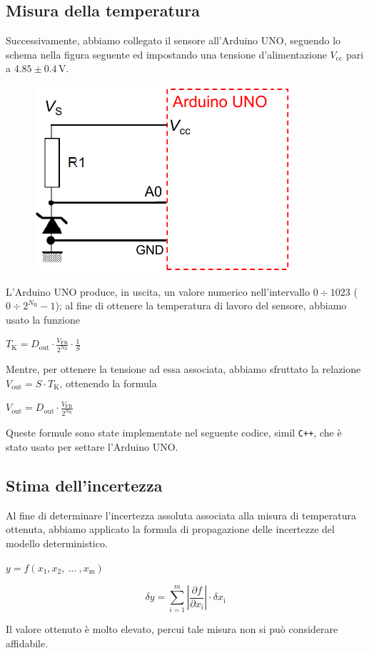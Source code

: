 \documentclass[a4paper]{article}
\newcommand\abs[1]{\left|#1\right|}
\begin{document}
		\subsection{Misura della temperatura}
			Successivamente, abbiamo collegato il sensore all'Arduino UNO, seguendo lo schema nella figura seguente ed impostando una tensione d'alimentazione $ V_{\mathrm{cc}} $ pari a $ 4.85 \pm 0.4 \, \mathrm{V} $.
			\begin{figure}[h!]
				\centering
				\includegraphics[scale=0.5]{collegamentoCircuitoArduino}
				\label{fig:collegamentoCircuitoArduino}
			\end{figure}
			\newline
			L'Arduino UNO produce, in uscita, un valore numerico nell'intervallo $ 0 \div 1023 $ ($ 0 \div 2^{N_{\mathrm{B}}} - 1 $); al fine di ottenere la temperatura di lavoro del sensore, abbiamo usato la funzione
			\begin{center}
				$ T_{\mathrm{K}} = D_{\mathrm{out}} \cdot \frac{V_{\mathrm{FR}}}{2^{N_{\mathrm{B}}}} \cdot \frac{1}{S} $
			\end{center}
			Mentre, per ottenere la tensione ad essa associata, abbiamo sfruttato la relazione $ V_{\mathrm{out}} = S \cdot T_{\mathrm{K}} $, ottenendo la formula
			\begin{center}
				$ V_{\mathrm{out}} = D_{\mathrm{out}} \cdot \frac{V_{\mathrm{FR}}}{2^{N_{\mathrm{B}}}} $
			\end{center}
			Queste formule sono state implementate nel seguente codice, simil \verb!C++!, che è stato usato per settare l'Arduino UNO.
			\newpage
			
		\subsection{Stima dell'incertezza}
			Al fine di determinare l'incertezza assoluta associata alla misura di temperatura ottenuta, abbiamo applicato la formula di propagazione delle incertezze del modello deterministico.
			\begin{center}
				$ y = f(x_{1}, x_{2}, \ \dots \ , x_{\mathrm{m}}) $
			\end{center}
			\begin{center}
				$$ \delta y = \sum_{i=1}^{m} \abs{\frac{\partial f}{\partial x_{\mathrm{i}}}} \cdot \delta x_{\mathrm{i}} $$
			\end{center}
			Il valore ottenuto è molto elevato, percui tale misura non si può considerare affidabile.
\end{document}
